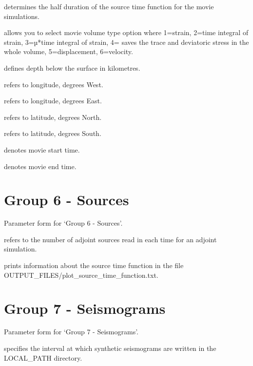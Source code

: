 \documentclass[english]{book}
\begin{document}
 determines the half duration of the source time function
for the movie simulations.

 allows you to select movie volume type option
where 1=strain, 2=time integral of strain, 3=µ*time integral of strain,
4= saves the trace and deviatoric stress in the whole volume,
5=displacement, 6=velocity.

 defines depth below the surface in
kilometres.

 refers to longitude, degrees West.

 refers to longitude, degrees East.

 refers to latitude, degrees North.

 refers to latitude, degrees South.

 denotes movie start time.

 denotes movie end time.


\section{Group 6 - Sources}
\label{\detokenize{Appendix2:a2-7-group-6-sources}}

 Parameter form for ‘Group 6 - Sources’.

 refers to the number of adjoint
sources read in each time for an adjoint simulation.

 prints information about the source
time function in the file
OUTPUT\_FILES/plot\_source\_time\_function.txt.


\section{Group 7 - Seismograms}
\label{\detokenize{Appendix2:a2-8-group-7-seismograms}}

 Parameter form for ‘Group 7 - Seismograms’.

 specifies the interval at which
synthetic seismograms are written in the LOCAL\_PATH directory.
\end{document}
